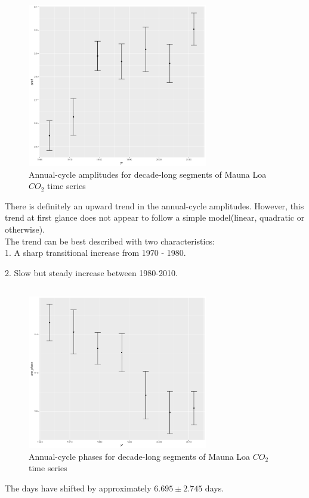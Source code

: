 \documentclass[paper=a4, fontsize=11pt]{scrartcl}
\numberwithin{equation}{section} %
\numberwithin{figure}{section} %
\numberwithin{table}{section} %
\begin{document}
\begin{figure}[htp]
	\centering
	\includegraphics[width=0.7\textwidth, clip]{q3a.png} 
	\caption{Annual-cycle amplitudes for decade-long segments of Mauna Loa $CO_2$ time series}
\end{figure}
There is definitely an upward trend in the annual-cycle amplitudes. However, this trend at first glance does not appear to follow a simple model(linear, quadratic or otherwise).
\\

The trend can be best described with two characteristics:\\
1. A sharp transitional increase from 1970 - 1980.


2. Slow but steady increase between 1980-2010.

\pagebreak
\subsection{}

\begin{figure}[htp]
	\centering
	\includegraphics[width=0.7\textwidth, clip]{q3b.png} 
	\caption{Annual-cycle phases for decade-long segments of Mauna Loa $CO_2$ time series}
\end{figure}
The days have shifted by approximately $6.695\pm 2.745$ days.
\end{document}
